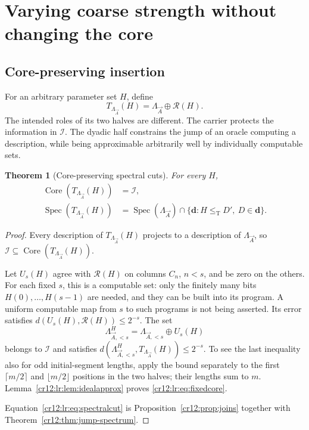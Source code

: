 \documentclass[11pt,letterpaper]{article}
\theoremstyle{plain}
\newtheorem{theorem}{Theorem}[section]
\theoremstyle{definition}
\theoremstyle{remark}
\numberwithin{equation}{section}
\newcommand{\leT}{\leq_{\mathrm T}}
\newcommand{\Core}{\operatorname{Core}}
\newcommand{\Spec}{\operatorname{Spec}}
\newcommand{\Rcode}{\mathcal R}
\newcommand{\I}{\mathcal I}
\newcommand{\Lam}{\Lambda_{\vec A}}      %
\begin{document}
\section{Varying coarse strength without changing the core}\label{cr12:lr:sec:insertion}
\subsection{Core-preserving insertion}
For an arbitrary parameter set $H$, define
\begin{equation}\label{cr12:lr:eq:decorated}
 T_{\Lam}(H)=\Lam\oplus\Rcode(H).
\end{equation}
The intended roles of its two halves are different. The carrier protects the
information in $\I$. The dyadic half constrains the jump of an oracle computing a
description, while being approximable arbitrarily well by individually computable
sets.

\begin{theorem}[Core-preserving spectral cuts]\label{cr12:lr:thm:insertion}
For every $H$,
\begin{align}
 \Core(T_{\Lam}(H))&=\I,\label{cr12:lr:eq:fixedcore}\\
 \Spec(T_{\Lam}(H))&=\Spec(\Lam)\cap\{\mathbf d:H\leT D',\ D\in\mathbf d\}.
 \label{cr12:lr:eq:spectralcut}
\end{align}
\end{theorem}
\begin{proof}
Every description of $T_{\Lam}(H)$ projects to a description of $\Lam$, so
$\I\subseteq\Core(T_{\Lam}(H))$.

Let $U_s(H)$ agree with $\Rcode(H)$ on columns $C_n$, $n<s$, and be zero on the others.
For each fixed $s$, this is a computable set: only the finitely many bits
$H(0),\ldots,H(s-1)$ are needed, and they can be built into its program. A uniform
computable map from $s$ to such programs is not being asserted. Its error satisfies
$d(U_s(H),\Rcode(H))\leq2^{-s}$. The set
\[
 \Lambda^H_{\vec A,<s}=\Lambda_{\vec A,<s}\oplus U_s(H)
\]
belongs to $\I$ and satisfies $d(\Lambda^H_{\vec A,<s},T_{\Lam}(H))\leq2^{-s}$. To see the last
inequality also for odd initial-segment lengths, apply the bound separately to the
first $\lceil m/2\rceil$ and $\lfloor m/2\rfloor$ positions in the two halves; their
lengths sum to $m$. Lemma~\ref{cr12:lr:lem:idealapprox} proves
\eqref{cr12:lr:eq:fixedcore}.

Equation~\eqref{cr12:lr:eq:spectralcut} is Proposition~\ref{cr12:prop:joins} together
with Theorem~\ref{cr12:thm:jump-spectrum}.
\end{proof}
\end{document}
